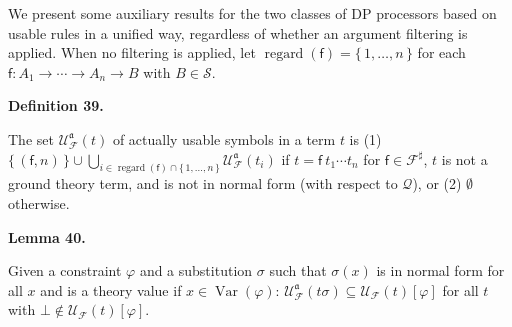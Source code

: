  
 
We present some auxiliary results for the two classes of DP processors based on usable rules in a unified way, regardless of whether an argument filtering is applied. When no filtering is applied, let $\operatorname{regard}(\mathsf{f})=\{\,1,\ldots,n\,\}$ for each $\mathsf{f}:{A}_{1}\rightarrow\cdots\rightarrow{A}_{n}\rightarrow B$ with $B\in\mathcal{S}$.\par
 
 
 
\par\medskip\noindent\textbf{Definition 39.}\par
 
 
The set $\mathcal{U}_{\mathcal{F}}^{\mathfrak{a}}(t)$ of actually usable symbols in a term $t$ is (1) $\{\,(\mathsf{f},n)\,\}\cup\bigcup_{i\in\operatorname{regard}(\mathsf{f})\cap\{\,1,\ldots,n\,\}}\mathcal{U}_{\mathcal{F}}^{\mathfrak{a}}(t_{i})$ if $t={\mathsf{f}}\ {{t}_{1}\cdots{t}_{n}}$ for $\mathsf{f}\in\mathcal{F}^{\sharp}$, $t$ is not a ground theory term, and is not in normal form (with respect to $\mathcal{Q}$), or (2) $\emptyset$ otherwise.\par
 
 
 
 
\par\medskip\noindent\textbf{Lemma 40.}\par
 
 
Given a constraint $\varphi$ and a substitution $\sigma$ such that $\sigma(x)$ is in normal form for all $x$ and is a theory value if $x\in\operatorname{Var}(\varphi)$: $\mathcal{U}_{\mathcal{F}}^{\mathfrak{a}}(t\sigma)\subseteq\mathcal{U}_{\mathcal{F}}(t)[\varphi]$ for all $t$ with $\bot\notin\mathcal{U}_{\mathcal{F}}(t)[\varphi]$.\par
 
 
 
 
 
